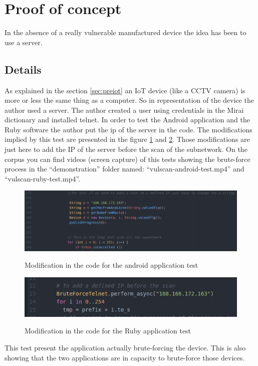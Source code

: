 \documentclass{report}
\begin{document}
\section{Proof of concept}
In the absence of a really vulnerable manufactured device the idea has been to use a server.

\subsection{Details}
As explained in the section \ref{sec:preiot} an IoT device (like a CCTV camera) is more or less the same thing as a computer. So in representation of the device the author used a server. The author created a user using credentials in the Mirai dictionary and installed telnet. In order to test the Android application and the Ruby software the author put the ip of the server in the code. The modifications implied by this test are presented in the figure \ref{fig:mod-and} and \ref{fig:mod-ruby}. Those modifications are just here to add the IP of the server before the scan of the subnetwork. On the corpus you can find videos (screen capture) of this tests showing the brute-force process in the ``demonstration'' folder named: ``vulscan-android-test.mp4'' and ``vulscan-ruby-test.mp4''.
\begin{figure}[h]
 \caption{Modification in the code for the android application test}
 \centering
 \includegraphics[width=1.2\textwidth]{./img/exp/vulscan-android-test-modification}
 \label{fig:mod-and}
\end{figure}
\begin{figure}[h]
 \caption{Modification in the code for the Ruby application test}
 \centering
 \includegraphics[width=1.2\textwidth]{./img/exp/vulscan-ruby-test-modification}
 \label{fig:mod-ruby}
\end{figure}
This test present the application actually brute-forcing the device. This is also showing that the two applications are in capacity to brute-force those devices.
\end{document}
